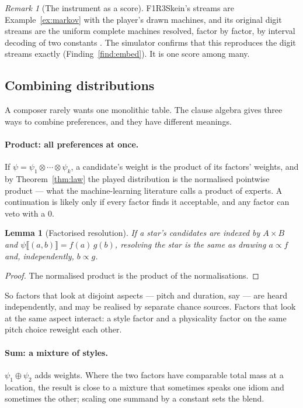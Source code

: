 \documentclass[11pt,a4paper]{article}
\theoremstyle{plain}
\newtheorem{lemma}[theorem]{Lemma}
\theoremstyle{definition}
\theoremstyle{remark}
\newtheorem{remark}[theorem]{Remark}
\newcommand{\tensorv}{\otimes}
\newcommand{\sumv}{\oplus}
\begin{document}
\begin{remark}[The instrument as a score]\label{rem:skein}
F1R3Skein's streams are Example~\ref{ex:markov} with the player's drawn
machines, and its original digit streams are the uniform complete machines
resolved, factor by factor, by interval decoding of two constants
\cite{SkeinDrawn}. The simulator confirms that this reproduces the digit
streams exactly (Finding~\ref{find:embed}). It is one score among many.
\end{remark}

\subsection{Combining distributions}\label{ssec:combine}

A composer rarely wants one monolithic table. The clause algebra gives three
ways to combine preferences, and they have different meanings.

\paragraph{Product: all preferences at once.}
If $\psi = \psi_1 \tensorv \cdots \tensorv \psi_k$, a candidate's weight is the
product of its factors' weights, and by Theorem~\ref{thm:law} the played
distribution is the normalised pointwise product --- what the machine-learning
literature calls a product of experts. A continuation is likely only if every
factor finds it acceptable, and any factor can veto with a $0$.

\begin{lemma}[Factorised resolution]\label{lem:factor}
If a star's candidates are indexed by $A\times B$ and
$\psi\llbracket(a,b)\rrbracket = f(a)\,g(b)$, resolving the star is the same as
drawing $a \propto f$ and, independently, $b \propto g$.
\end{lemma}
\begin{proof}
The normalised product is the product of the normalisations.
\end{proof}

\noindent So factors that look at disjoint aspects --- pitch and duration, say
--- are heard independently, and may be realised by separate chance sources.
Factors that look at the same aspect interact: a style factor and a physicality
factor on the same pitch choice reweight each other.

\paragraph{Sum: a mixture of styles.}
$\psi_1 \sumv \psi_2$ adds weights. Where the two factors have comparable total
mass at a location, the result is close to a mixture that sometimes speaks one
idiom and sometimes the other; scaling one summand by a constant sets the
blend.
\end{document}
